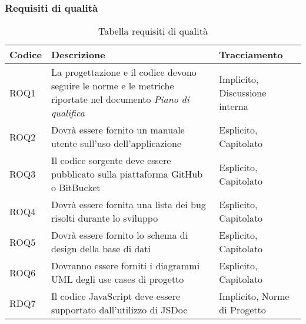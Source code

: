 \subsubsection{Requisiti di qualità}\label{subsec:requisiti_qualita}
\begin{xltabular}{\textwidth}{ p{0.1\textwidth} | X | p{0.3\textwidth} }
    \textbf{\color{white} Codice} & \textbf{\color{white} Descrizione} & \textbf{\color{white} Tracciamento} \\ 
    \endhead

    \caption{Tabella requisiti di qualità}
    \endlastfoot

    ROQ1 & La progettazione e il codice devono seguire le norme e le metriche riportate nel documento \textit{Piano di qualifica} & Implicito, Discussione interna \\
    ROQ2 & Dovrà essere fornito un manuale utente sull'uso dell'applicazione & Esplicito, Capitolato \\
    ROQ3 & Il codice sorgente deve essere pubblicato sulla piattaforma GitHub o BitBucket & Esplicito, Capitolato \\
    ROQ4 & Dovrà essere fornita una lista dei bug risolti durante lo sviluppo & Esplicito, Capitolato \\ 
    ROQ5 & Dovrà essere fornito lo schema di design della base di dati & Esplicito, Capitolato \\ 
    ROQ6 & Dovranno essere forniti i diagrammi UML degli use cases di progetto & Esplicito, Capitolato \\ 
    RDQ7 & Il codice JavaScript deve essere supportato dall'utilizzo di JSDoc & Implicito, Norme di Progetto \\
    \hline
\end{xltabular}


